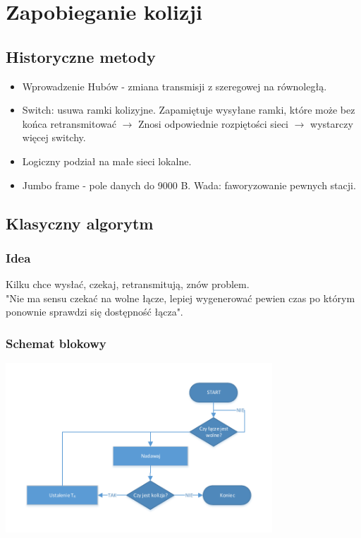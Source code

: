\documentclass[a4paper,twoside]{article}
\begin{document}
\section{Zapobieganie kolizji}
	\subsection{Historyczne metody}
		\begin{itemize}
			\item Wprowadzenie Hubów - zmiana transmisji z szeregowej na równoległą.
			\item Switch: usuwa ramki kolizyjne. Zapamiętuje wysyłane ramki, które może bez końca retransmitować $ \rightarrow $ Znosi odpowiednie rozpiętości sieci $ \rightarrow $ wystarczy więcej switchy.
			\item Logiczny podział na małe sieci lokalne.
			\item Jumbo frame - pole danych do 9000 B. Wada: faworyzowanie pewnych stacji.
		\end{itemize}
	\subsection{Klasyczny algorytm}
		\subsubsection{Idea}
			Kilku chce wysłać, czekaj, retransmitują, znów problem.\\
			"Nie ma sensu czekać na wolne łącze, lepiej wygenerować pewien czas po którym ponownie sprawdzi się dostępność łącza".
		\subsubsection{Schemat blokowy}
			\includegraphics[width=10cm]{./images/image21.pdf}
\end{document}
